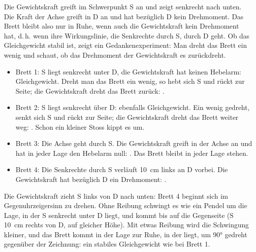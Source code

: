 Die Gewichtskraft greift im Schwerpunkt S an und zeigt senkrecht nach unten. Die Kraft der Achse greift in D an und hat bezüglich D kein Drehmoment. Das Brett bleibt also nur in Ruhe, wenn auch die Gewichtskraft kein Drehmoment hat, d.\,h. wenn ihre Wirkungslinie, die Senkrechte durch S, durch D geht. Ob das Gleichgewicht stabil ist, zeigt ein Gedankenexperiment: Man dreht das Brett ein wenig und schaut, ob das Drehmoment der Gewichtskraft es zurückdreht.

\begin{abcliste}
\abc
\begin{itemize}
 \item Brett 1: S liegt senkrecht unter D, die Gewichtskraft hat keinen Hebelarm: Gleichgewicht. Dreht man das Brett ein wenig, so hebt sich S und rückt zur Seite; die Gewichtskraft dreht das Brett zurück: .
 \item Brett 2: S liegt senkrecht über D: ebenfalls Gleichgewicht. Ein wenig gedreht, senkt sich S und rückt zur Seite; die Gewichtskraft dreht das Brett weiter weg: . Schon ein kleiner Stoss kippt es um.
 \item Brett 3: Die Achse geht durch S. Die Gewichtskraft greift in der Achse an und hat in jeder Lage den Hebelarm null: . Das Brett bleibt in jeder Lage stehen.
 \item Brett 4: Die Senkrechte durch S verläuft \SI{10}{\cm} links an D vorbei. Die Gewichtskraft hat bezüglich D ein Drehmoment: .
\end{itemize}

\abc
Die Gewichtskraft zieht S links von D nach unten: Brett 4 beginnt sich im Gegenuhrzeigersinn zu drehen. Ohne Reibung schwingt es wie ein Pendel um die Lage, in der S senkrecht unter D liegt, und kommt bis auf die Gegenseite (S \SI{10}{\cm} rechts von D, auf gleicher Höhe). Mit etwas Reibung wird die Schwingung kleiner, und das Brett kommt in der Lage zur Ruhe, in der  liegt, um \ang{90} gedreht gegenüber der Zeichnung: ein stabiles Gleichgewicht wie bei Brett 1.
\end{abcliste}
